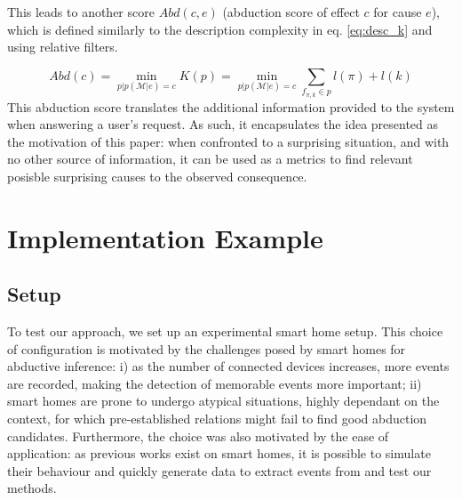 \documentclass[conference]{IEEEtran}
\begin{document}
This leads to another score $Abd(c,e)$ (abduction score of effect $c$ for cause
$e$), which is defined similarly to the description complexity in eq.
\ref{eq:desc_k} and using relative filters.

\begin{equation}
  \label{eq:abd_k}
  Abd(c) = \min_{p | p(\mathcal{M}|e) = c} K(p) = \min_{p | p(\mathcal{M}|e)=c} \sum_{f_{\pi, k} \in p} l(\pi) + l(k)
\end{equation}
This abduction score translates the additional information provided to the
system when answering a user's request. As such, it encapsulates the idea
presented as the motivation of this paper: when confronted to a surprising
situation, and with no other source of information, it can be used as a metrics
to find relevant posisble surprising causes to the observed consequence.


\section{Implementation Example}
\label{sec:example}
\subsection{Setup}
To test our approach, we set up an experimental smart home setup. This choice of
configuration is motivated by the challenges posed by smart homes for abductive
inference: i) as the number of connected devices increases, more events are
recorded, making the detection of memorable events more important; ii) smart
homes are prone to undergo atypical situations, highly dependant on the context,
for which pre-established relations might fail to find good abduction
candidates. Furthermore, the choice was also motivated by the ease of application: as
previous works exist on smart homes, it is possible to simulate their behaviour
and quickly generate data to extract events from and test our methods.


\end{document}
